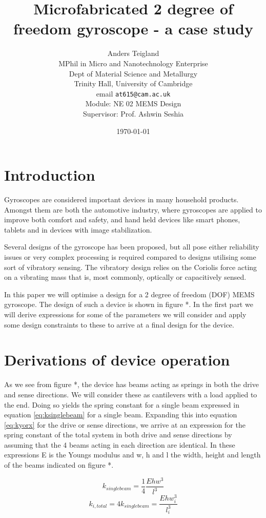 \documentclass[12pt,a4paper,titlepage]{article}
\title{Microfabricated 2 degree of freedom gyroscope - a case study}
\date{\today}
\author{Anders Teigland\\ MPhil in Micro and Nanotechnology Enterprise \\ Dept of Material Science and Metallurgy\\ Trinity Hall, University of Cambridge\\ email \texttt{at615@cam.ac.uk}\\ Module: NE 02 MEMS Design \\ Supervisor: Prof. Ashwin Seshia}
\begin{document}
\begin{spacing}{1.1}
\maketitle
\section{Introduction}
Gyroscopes are considered important devices in many household products. Amongst them are both the automotive industry, where gyroscopes are applied to improve both comfort and safety, and hand held devices like smart phones, tablets and in devices with image stabilization.

Several designs of the gyroscope has been proposed, but all pose either reliability issues or very complex processing is required compared to designs utilising some sort of vibratory sensing. The vibratory design relies on the Coriolis force acting on a vibrating mass that is, most commonly, optically or capacitively sensed.

In this paper we will optimise a design for a 2 degree of freedom (DOF) MEMS gyroscope. The design of such a device is shown in figure *. In the first part we will derive expressions for some of the parameters we will consider and apply some design constraints to these to arrive at a final design for the device.

\section{Derivations of device operation}
As we see from figure *, the device has beams acting as springs in both the drive and sense directions. We will consider these as cantilevers with a load applied to the end. Doing so yields the spring constant for a single beam expressed in equation \ref{eq:ksinglebeam} for a single beam. Expanding this into equation \ref{eq:kyorx} for the drive or sense directions, we arrive at an expression for the spring constant of the total system in both drive and sense directions by assuming that the 4 beams acting in each direction are identical. In these expressions E is the Youngs modulus and w, h and l the width, height and length of the beams indicated on figure *.

\begin{equation}
k_{single beam} = \dfrac{1}{4} \dfrac{E h w^3}{l^3}
\label{eq:ksinglebeam}
\end{equation}
\begin{equation}
k_{i,total} = 4 k_{single beam} = \dfrac{E h w_i^3}{l_i^3}
\label{eq:kyorx}
\end{equation}


\end{spacing}
\end{document}
